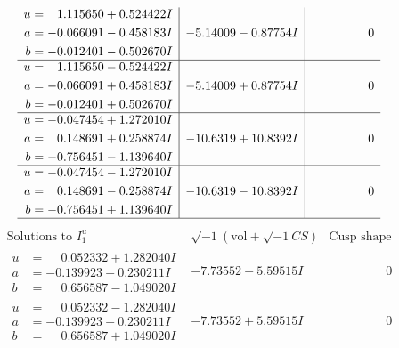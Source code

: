 \documentclass[1p]{elsarticle_modified}
\theoremstyle{definition}
\newcommand{\I}{\sqrt{-1}}
\begin{document}
$$\begin{array}{c|c|c}
\begin{aligned}
u &= \phantom{-}1.115650 + 0.524422 I \\
a &= -0.066091 - 0.458183 I \\
b &= -0.012401 - 0.502670 I\end{aligned}
 & -5.14009 - 0.87754 I & \phantom{-0.000000 } 0 \\ \hline\begin{aligned}
u &= \phantom{-}1.115650 - 0.524422 I \\
a &= -0.066091 + 0.458183 I \\
b &= -0.012401 + 0.502670 I\end{aligned}
 & -5.14009 + 0.87754 I & \phantom{-0.000000 } 0 \\ \hline\begin{aligned}
u &= -0.047454 + 1.272010 I \\
a &= \phantom{-}0.148691 + 0.258874 I \\
b &= -0.756451 - 1.139640 I\end{aligned}
 & -10.6319 + 10.8392 I & \phantom{-0.000000 } 0 \\ \hline\begin{aligned}
u &= -0.047454 - 1.272010 I \\
a &= \phantom{-}0.148691 - 0.258874 I \\
b &= -0.756451 + 1.139640 I\end{aligned}
 & -10.6319 - 10.8392 I & \phantom{-0.000000 } 0\\
 \hline 
 \end{array}$$\newpage$$\begin{array}{c|c|c}  
\text{Solutions to }I^u_{1}& \I (\text{vol} + \sqrt{-1}CS) & \text{Cusp shape}\\
 \hline 
\begin{aligned}
u &= \phantom{-}0.052332 + 1.282040 I \\
a &= -0.139923 + 0.230211 I \\
b &= \phantom{-}0.656587 - 1.049020 I\end{aligned}
 & -7.73552 - 5.59515 I & \phantom{-0.000000 } 0 \\ \hline\begin{aligned}
u &= \phantom{-}0.052332 - 1.282040 I \\
a &= -0.139923 - 0.230211 I \\
b &= \phantom{-}0.656587 + 1.049020 I\end{aligned}
 & -7.73552 + 5.59515 I & \phantom{-0.000000 } 0 \\ \hline\begin{aligned}

\end{aligned}
\end{array}$$
\end{document}
